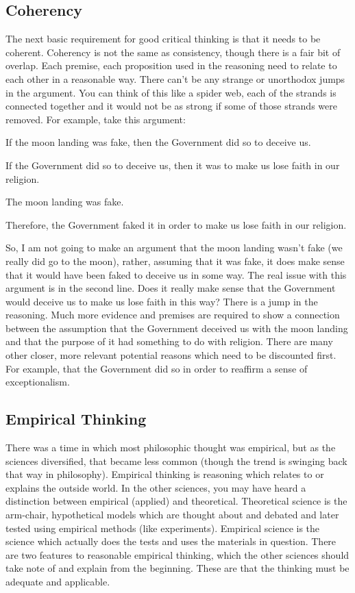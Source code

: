 \subsection{Coherency}

The next basic requirement for good critical thinking is that it needs to be coherent. Coherency is not the same as consistency, though there is a fair bit of overlap. Each premise, each proposition used in the reasoning need to relate to each other in a reasonable way. There can't be any strange or unorthodox jumps in the argument. You can think of this like a spider web, each of the strands is connected together and it would not be as strong if some of those strands were removed. For example, take this argument:
\begin{earg}
    \item[]If the moon landing was fake, then the Government did so to deceive us.
    \item[]If the Government did so to deceive us, then it was to make us lose faith in our religion.
    \item[]The moon landing was fake.
    \item[]Therefore, the Government faked it in order to make us lose faith in our religion.
\end{earg}
So, I am not going to make an argument that the moon landing wasn't fake (we really did go to the moon), rather, assuming that it was fake, it does make sense that it would have been faked to deceive us in some way. The real issue with this argument is in the second line. Does it really make sense that the Government would deceive us to make us lose faith in this way? There is a jump in the reasoning. Much more evidence and premises are required to show a connection between the assumption that the Government deceived us with the moon landing and that the purpose of it had something to do with religion. There are many other closer, more relevant potential reasons which need to be discounted first. For example, that the Government did so in order to reaffirm a sense of exceptionalism.

\subsection{Empirical Thinking}

There was a time in which most philosophic thought was empirical, but as the sciences diversified, that became less common (though the trend is swinging back that way in philosophy). Empirical thinking is reasoning which relates to or explains the outside world. In the other sciences, you may have heard a distinction between empirical (applied) and theoretical. Theoretical science is the arm-chair, hypothetical models which are thought about and debated and later tested using empirical methods (like experiments). Empirical science is the science which actually does the tests and uses the materials in question. There are two features to reasonable empirical thinking, which the other sciences should take note of and explain from the beginning. These are that the thinking must be adequate and applicable.

